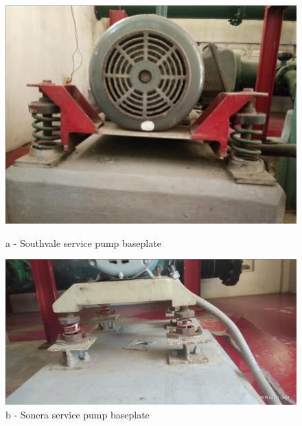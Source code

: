 \begin{figure}[!htb]
	\begin{minipage}[b]{0.3\linewidth}
		\centering
		\includegraphics[width=\textwidth]{figures/fig_ch043_spring_mounted_baseplates1}
		\caption*{a - Southvale service pump baseplate}
	\end{minipage}
	\hspace{0.05cm}
	\begin{minipage}[b]{0.3\linewidth}
		\centering
		\includegraphics[width=\textwidth]{figures/fig_ch043_spring_mounted_baseplates4}
		\caption*{b - Sonera service pump baseplate}
	\end{minipage}
	\hspace{0.05cm}
	\begin{minipage}[b]{0.3\linewidth}
		\centering

\end{minipage}
\end{figure}
